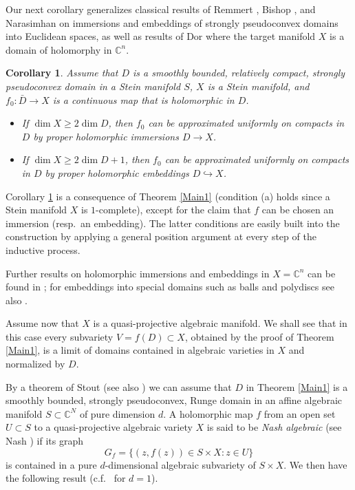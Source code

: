 \documentclass[11pt]{amsart}
\numberwithin{equation}{section}
\newtheorem{corollary}[theorem]{Corollary}
\theoremstyle{definition}
\begin{document}
Our next corollary generalizes classical results of Remmert 
\cite{Remmert1}, Bishop \cite{Bishop},
and Narasimhan \cite{Nar1} on immersions and embeddings 
of strongly pseudoconvex domains into Euclidean spaces, 
as well as results of Dor \cite{Dor0,Dor1} where the target 
manifold $X$ is a domain of holomorphy in ${\mathbb{C}}^n$.  

\begin{corollary}
\label{cor1}
Assume that $D$ is a smoothly bounded, relatively compact,
strongly pseudoconvex domain in a Stein manifold $S$, 
$X$ is a Stein manifold, and $f_0\colon\bar D\to X$ is a continuous map 
that is holomorphic in $D$. 
\begin{itemize}
\item[(i)] If $\dim X\ge 2\dim D$, then $f_0$ can be approximated 
uniformly on compacts in $D$ by proper holomorphic immersions $D\to X$.
\item[(ii)] If $\dim X\ge 2\dim D +1$, then $f_0$ can be approximated 
uniformly on compacts in $D$ by proper holomorphic embeddings $D{\hookrightarrow} X$.
\end{itemize}
\end{corollary}

Corollary \ref{cor1} is a consequence of Theorem \ref{Main1}
(condition (a) holds since a Stein manifold $X$ is $1$-complete), 
except for the claim that $f$ can be chosen 
an immersion (resp.\ an embedding). The latter conditions
are easily built into the construction by applying a 
general position argument at every step of the inductive process. 

Further results on holomorphic immersions and embeddings in $X={\mathbb{C}}^n$ 
can be found in \cite{EG,FW,FIKP,Prezelj,Sch,Wo1,Wo2}; for embeddings into 
special domains such as balls and polydiscs see also 
\cite{DorBalls,TAMS,Glob1,Hakim,Low2,Sten}.

Assume now that $X$ is a quasi-projective algebraic manifold.
We shall see that in this case every subvariety $V=f(D)\subset X$,
obtained by the proof of Theorem \ref{Main1}, is a limit of domains
contained in algebraic varieties in $X$ and normalized by $D$. 

By a theorem of Stout \cite{Stout} (see also \cite{DLS,LM})
we can assume that $D$ in Theorem \ref{Main1} is a smoothly bounded, 
strongly pseudoconvex, Runge domain 
in an affine algebraic manifold $S\subset{\mathbb{C}}^N$
of pure dimension $d$. A holomorphic map $f$ from an open set $U\subset S$ to 
a quasi-projective algebraic variety $X$ is said to be {\em Nash algebraic} 
(see Nash \cite{Nash}) if its graph 
\[
	G_f=\{(z,f(z)) \in S\times X\colon z\in U\}
\]
is contained in a pure $d$-dimensional algebraic subvariety of 
$S\times X$. We then have the following result 
(c.f.\ \cite[Corollary 1.2]{BDF1} for $d=1$).
\end{document}
